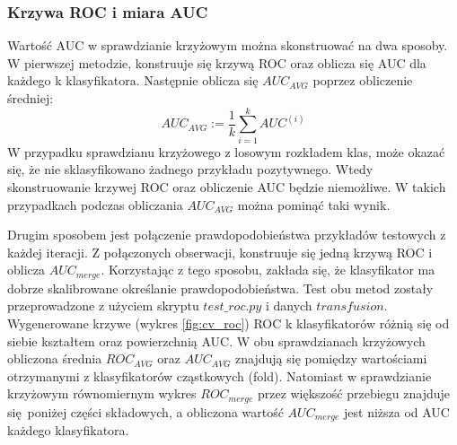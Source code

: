 \subsubsection{Krzywa ROC i miara AUC}
Wartość AUC w sprawdzianie krzyżowym można skonstruować na dwa sposoby. W pierwszej metodzie, konstruuje się krzywą ROC oraz oblicza się AUC dla każdego k klasyfikatora. Następnie oblicza się $AUC_{AVG}$ poprzez obliczenie średniej:
\[AUC_{AVG} := \frac{1}{k} \sum_{i=1}^{k} AUC^{(i)} \]
W przypadku sprawdzianu krzyżowego z losowym rozkładem klas, może okazać się, że nie sklasyfikowano żadnego przykładu pozytywnego. Wtedy skonstruowanie krzywej ROC oraz obliczenie AUC będzie niemożliwe. W takich przypadkach podczas obliczania $AUC_{AVG}$ można pominąć taki wynik. \par
Drugim sposobem jest połączenie prawdopodobieństwa przykładów testowych z każdej iteracji. Z połączonych obserwacji, konstruuje się jedną krzywą ROC i oblicza $AUC_{merge}$. Korzystając z tego sposobu, zakłada się, że klasyfikator ma dobrze skalibrowane określanie prawdopodobieństwa.  Test obu metod zostały przeprowadzone z użyciem skryptu $test\_roc.py$ i danych $transfusion$. Wygenerowane krzywe (wykres \ref{fig:cv_roc}) ROC k klasyfikatorów różnią się od siebie kształtem oraz powierzchnią AUC. W obu sprawdzianach krzyżowych obliczona średnia $ROC_{AVG}$ oraz $AUC_{AVG}$ znajdują się pomiędzy wartościami otrzymanymi z klasyfikatorów cząstkowych (fold). Natomiast w sprawdzianie krzyżowym równomiernym wykres $ROC_{merge}$ przez większość przebiegu znajduje się poniżej części składowych, a obliczona wartość $AUC_{merge}$ jest niższa od AUC każdego klasyfikatora.
